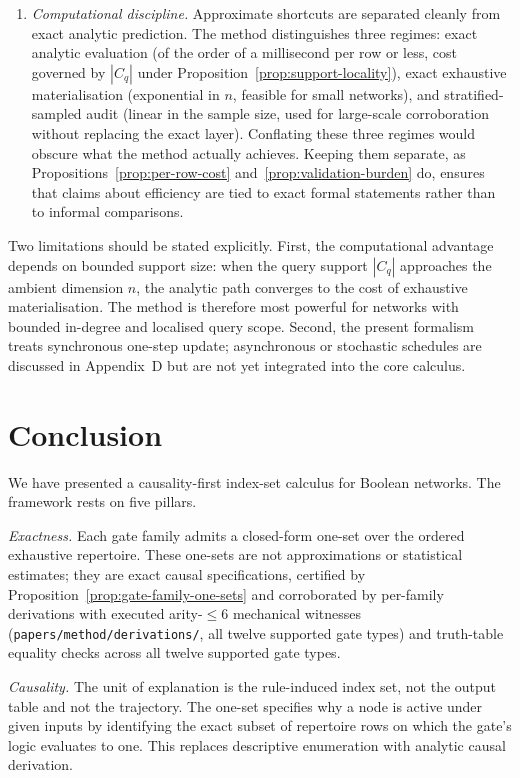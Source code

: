 \documentclass[11pt]{article}
\theoremstyle{definition}
\begin{document}
\begin{enumerate}[label=\arabic*.]
\item \emph{Computational discipline.} Approximate shortcuts are separated cleanly from exact analytic prediction. The method distinguishes three regimes: exact analytic evaluation (of the order of a millisecond per row or less, cost governed by \(|C_q|\) under Proposition~\ref{prop:support-locality}), exact exhaustive materialisation (exponential in \(n\), feasible for small networks), and stratified-sampled audit (linear in the sample size, used for large-scale corroboration without replacing the exact layer). Conflating these three regimes would obscure what the method actually achieves. Keeping them separate, as Propositions~\ref{prop:per-row-cost} and~\ref{prop:validation-burden} do, ensures that claims about efficiency are tied to exact formal statements rather than to informal comparisons.
\end{enumerate}

Two limitations should be stated explicitly. First, the computational advantage depends on bounded support size: when the query support \(|C_q|\) approaches the ambient dimension \(n\), the analytic path converges to the cost of exhaustive materialisation. The method is therefore most powerful for networks with bounded in-degree and localised query scope. Second, the present formalism treats synchronous one-step update; asynchronous or stochastic schedules are discussed in Appendix~D but are not yet integrated into the core calculus.

\section{Conclusion}
We have presented a causality-first index-set calculus for Boolean networks. The framework rests on five pillars.

\emph{Exactness.} Each gate family admits a closed-form one-set over the ordered exhaustive repertoire. These one-sets are not approximations or statistical estimates; they are exact causal specifications, certified by Proposition~\ref{prop:gate-family-one-sets} and corroborated by per-family derivations with executed arity-$\leq 6$ mechanical witnesses (\texttt{papers/method/derivations/}, all twelve supported gate types) and truth-table equality checks across all twelve supported gate types.

\emph{Causality.} The unit of explanation is the rule-induced index set, not the output table and not the trajectory. The one-set specifies why a node is active under given inputs by identifying the exact subset of repertoire rows on which the gate's logic evaluates to one. This replaces descriptive enumeration with analytic causal derivation.
\end{document}
